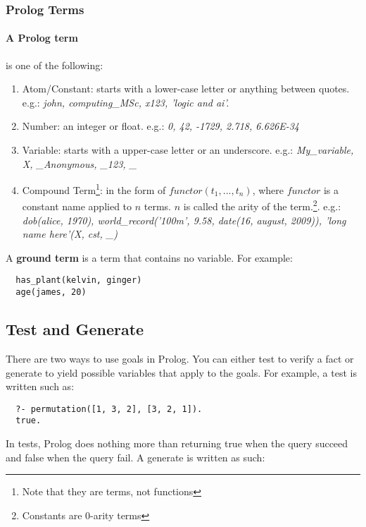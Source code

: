 \documentclass{article}
\begin{document}
\begin{multicols}{2}
  \subsubsection{Prolog Terms}
  
  \paragraph{A Prolog term} is one of the following:
  
  \begin{enumerate}
  \item Atom/Constant: starts with a lower-case letter or anything between quotes. e.g.: \textit{john, computing\_MSc, x123, 'logic and ai'.}
  \item Number: an integer or float. e.g.: \textit{0, 42, -1729, 2.718, 6.626E-34}
  \item Variable: starts with a upper-case letter or an underscore. e.g.: \textit{My\_variable, X, \_Anonymous, \_123, \_} 
  \item Compound Term\footnote{Note that they are terms, not functions}: in the form of $functor(t_1,..., t_n)$, where $functor$ is a constant name applied to $n$ terms. $n$ is called the arity of the term.\footnote{Constants are 0-arity terms}. e.g.: \textit{dob(alice, 1970), world\_record('100m', 9.58, date(16, august, 2009)), 'long name here'(X, cst, \_)}
  \end{enumerate}
  
  \noindent A {\bf ground term} is a term that contains no variable. For example:
  
  \begin{lstlisting}
  has_plant(kelvin, ginger)
  age(james, 20)
  \end{lstlisting}
  
  \subsection{Test and Generate}
  
  There are two ways to use goals in Prolog. You can either test to verify a fact or generate to yield possible variables that apply to the goals. For example, a test is written such as:
  
  \begin{lstlisting}
  ?- permutation([1, 3, 2], [3, 2, 1]).
  true.
  \end{lstlisting}
  
  In tests, Prolog does nothing more than returning true when the query succeed and false when the query fail. A generate is written as such:
  

\end{multicols}
\end{document}
